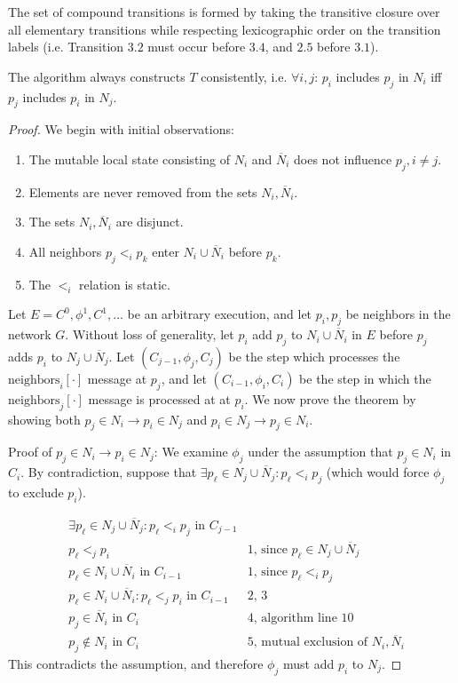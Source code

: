 The set of compound transitions is formed by taking the transitive closure over all elementary
transitions while respecting lexicographic order on the transition labels (i.e. Transition $3.2$
must occur before $3.4$, and $2.5$ before $3.1$).

\begin{theorem} \label{thm:tconsistent}
The algorithm always constructs $T$ consistently, i.e. $\forall i, j$:
$p_i$ includes $p_j$ in $N_i$ iff $p_j$ includes $p_i$ in $N_j$.
\end{theorem}

\begin{proof}
We begin with initial observations:

\begin{enumerate}
\item The mutable local state consisting of $N_i$ and
$\overline{N}_i$ does not influence $p_j, i \neq j$.
\item Elements are never removed from the sets $N_i, \overline{N}_i$.
\item The sets $N_i, \overline{N}_i$ are disjunct.
\item All neighbors $p_j <_i p_k$ enter $N_i \cup \overline{N}_i$ before $p_k$.
\item The $<_i$ relation is static.
\end{enumerate}

Let $E = C^0, \phi^1, C^1, \ldots$ be an arbitrary execution, and let $p_i, p_j$ be neighbors
in the network $G$. Without loss of generality, let $p_i$ add $p_j$ to $N_i \cup \overline{N}_i$
in $E$ before $p_j$ adds $p_i$ to $N_j \cup \overline{N}_j$. 
Let $(C_{j-1}, \phi_j, C_j)$ be the step which processes
the $\text{neighbors}_i[\cdot]$ message at $p_j$, and let $(C_{i-1}, \phi_i, C_i)$
be the step in which the $\text{neighbors}_j[\cdot]$ message is processed at at $p_i$.
We now prove the theorem by
showing both $p_j \in N_i \rightarrow p_i \in N_j$ and $p_i \in N_j \rightarrow p_j \in N_i$.

Proof of $p_j \in N_i \rightarrow p_i \in N_j$: 
We examine $\phi_j$ under the assumption that $p_j \in N_i$ in $C_i$.
By contradiction, suppose that $\exists p_\ell \in N_j \cup \overline{N}_j: 
p_\ell <_i p_j$ (which would force $\phi_j$ to exclude $p_i$). 

\begin{align}
&\exists p_\ell \in N_j \cup \overline{N}_j: p_\ell <_i p_j \text{ in } C_{j-1} & \\
&p_\ell <_j p_i & \text{1, since } p_\ell \in N_j \cup \overline{N}_j \\
&p_\ell \in N_i \cup \overline{N}_i \text{ in } C_{i-1} & \text{1, since } p_\ell <_i p_j \\
&p_\ell \in N_i \cup \overline{N}_i: p_\ell <_j p_i \text{ in } C_{i-1} & \text{2, 3} \\
&p_j \in \overline{N}_i \text{ in } C_i & \text{4, algorithm line 10} \\
&p_j \not\in N_i \text{ in } C_i & \text{5, mutual exclusion of } N_i, \overline{N}_i
\end{align}
This contradicts the assumption, and therefore $\phi_j$ must add $p_i$ to $N_j$.


\end{proof}
